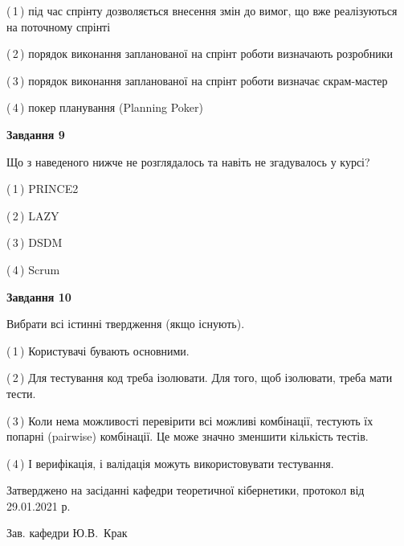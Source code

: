 \documentclass[10pt, ukrainian]{article}
\begin{document}
{\begin {large}
(\,1\,) під час спрінту дозволяється внесення змін до вимог, що вже реалізуються на поточному спрінті%



(\,2\,) порядок виконання запланованої на спрінт роботи визначають розробники%



(\,3\,) порядок виконання запланованої на спрінт роботи визначає скрам-мастер%



(\,4\,) покер планування (Planning Poker)%


{\begin {center}\textbf{Завдання 9}\end {center}}\par
Що з наведеного нижче не розглядалось та навіть не згадувалось у курсі?\par
\vspace{2mm}



(\,1\,) PRINCE2%



(\,2\,) LAZY%



(\,3\,) DSDM%



(\,4\,) Scrum%


{\begin {center}\textbf{Завдання 10}\end {center}}\par
Вибрати всі істинні твердження (якщо існують).\par
\vspace{2mm}



(\,1\,) Користувачі бувають основними.%



(\,2\,) Для тестування код треба ізолювати. Для того, щоб ізолювати, треба мати тести.%



(\,3\,) Коли нема можливості перевірити всі можливі комбінації, тестують їх попарні (pairwise) комбінації. Це може значно зменшити кількість тестів.%



(\,4\,) І верифікація, і валідація можуть використовувати тестування.%



\end {large}}
{\vspace{5mm}\smallskip \begin {small} Затверджено на засіданні кафедри теоретичної кібернетики, протокол  від   29.01.2021 р.\par\smallskip\smallskip
{\parbox {6.5 cm}{Зав. кафедри \dotfill Ю.В.~Крак}} \end{small}}
\newpage
\end{document}
